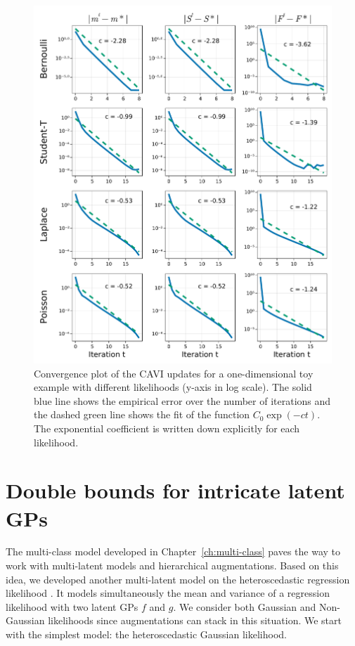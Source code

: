 \begin{figure}[H]
\centering
\includegraphics[width=\textwidth]{./chapters/8_discussions/figures/convergence.pdf}
\caption{Convergence plot of the \ac{CAVI} updates for a one-dimensional toy example with different likelihoods (y-axis in log scale).
The solid blue line shows the empirical error over the number of iterations and the dashed green line shows the fit of the function $C_0 \exp(-c t)$.
The exponential coefficient is written down explicitly for each likelihood.}
\label{fig:convergence}
\end{figure}


\section{Double bounds for intricate latent \acsp{GP}}
\label{sec:heteroscedastic}
The multi-class model developed in Chapter~\ref{ch:multi-class} paves the way to work with multi-latent models and hierarchical augmentations.
Based on this idea, we developed another multi-latent model on the heteroscedastic regression likelihood  \cite{wangGaussianProcessRegression2012,lazaro2011variational}.
It models simultaneously the mean and variance of a regression likelihood with two latent \acp{GP} $f$ and $g$.
We consider both Gaussian and Non-Gaussian likelihoods since augmentations can stack in this situation.
We start with the simplest model: the heteroscedastic Gaussian likelihood.

